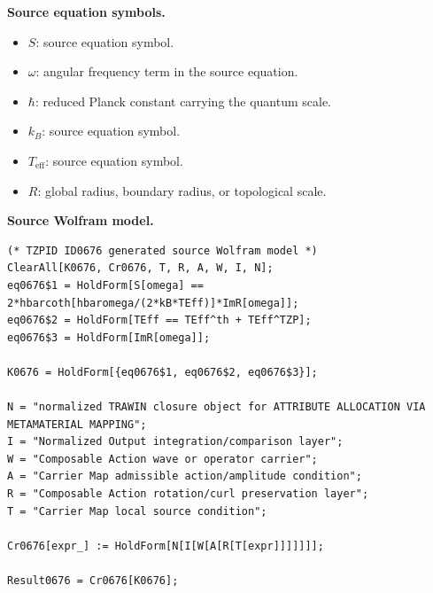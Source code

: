 \begin{minipage}[t]{0.49\linewidth}
\begingroup
\small
\raggedright
\textbf{Source equation symbols.}\par
\begin{itemize}[leftmargin=1.35em,itemsep=1pt,topsep=1pt,parsep=0pt]
    \item $S$: source equation symbol.
    \item $\omega$: angular frequency term in the source equation.
    \item $\hbar$: reduced Planck constant carrying the quantum scale.
    \item $k_B$: source equation symbol.
    \item $T_{\mathrm{eff}}$: source equation symbol.
    \item $R$: global radius, boundary radius, or topological scale.
\end{itemize}
\endgroup
\end{minipage}\hfill
\begin{minipage}[t]{0.47\linewidth}
\begingroup
\scriptsize
\raggedright
\textbf{Source Wolfram model.}\par
\begin{Verbatim}[fontsize=\tiny,breaklines=true,breakanywhere=true]
(* TZPID ID0676 generated source Wolfram model *)
ClearAll[K0676, Cr0676, T, R, A, W, I, N];
eq0676$1 = HoldForm[S[omega] == 2*hbarcoth[hbaromega/(2*kB*TEff)]*ImR[omega]];
eq0676$2 = HoldForm[TEff == TEff^th + TEff^TZP];
eq0676$3 = HoldForm[ImR[omega]];

K0676 = HoldForm[{eq0676$1, eq0676$2, eq0676$3}];

N = "normalized TRAWIN closure object for ATTRIBUTE ALLOCATION VIA METAMATERIAL MAPPING";
I = "Normalized Output integration/comparison layer";
W = "Composable Action wave or operator carrier";
A = "Carrier Map admissible action/amplitude condition";
R = "Composable Action rotation/curl preservation layer";
T = "Carrier Map local source condition";

Cr0676[expr_] := HoldForm[N[I[W[A[R[T[expr]]]]]]];

Result0676 = Cr0676[K0676];
\end{Verbatim}
\endgroup
\end{minipage}

